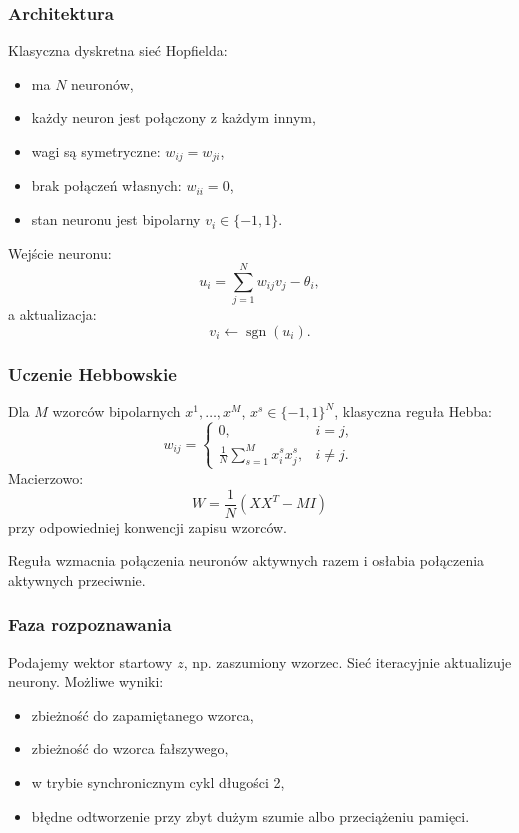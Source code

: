 \subsubsection{Architektura}

Klasyczna dyskretna sieć Hopfielda:
\begin{itemize}
  \item ma $N$ neuronów,
  \item każdy neuron jest połączony z każdym innym,
  \item wagi są symetryczne: $w_{ij}=w_{ji}$,
  \item brak połączeń własnych: $w_{ii}=0$,
  \item stan neuronu jest bipolarny $v_i\in\{-1,1\}$.
\end{itemize}

Wejście neuronu:
\[
u_i=\sum_{j=1}^{N}w_{ij}v_j-\theta_i,
\]
a aktualizacja:
\[
v_i\leftarrow \operatorname{sgn}(u_i).
\]

\subsubsection{Uczenie Hebbowskie}

Dla $M$ wzorców bipolarnych $x^1,\dots,x^M$, $x^s\in\{-1,1\}^N$, klasyczna reguła Hebba:
\[
w_{ij}=
\begin{cases}
0, & i=j,\\
\frac{1}{N}\sum_{s=1}^{M}x_i^s x_j^s, & i\ne j.
\end{cases}
\]
Macierzowo:
\[
W=\frac{1}{N}(XX^T-MI)
\]
przy odpowiedniej konwencji zapisu wzorców.

Reguła wzmacnia połączenia neuronów aktywnych razem i osłabia połączenia aktywnych przeciwnie.

\subsubsection{Faza rozpoznawania}

Podajemy wektor startowy $z$, np. zaszumiony wzorzec. Sieć iteracyjnie aktualizuje neurony. Możliwe wyniki:
\begin{itemize}
  \item zbieżność do zapamiętanego wzorca,
  \item zbieżność do wzorca fałszywego,
  \item w trybie synchronicznym cykl długości 2,
  \item błędne odtworzenie przy zbyt dużym szumie albo przeciążeniu pamięci.
\end{itemize}

